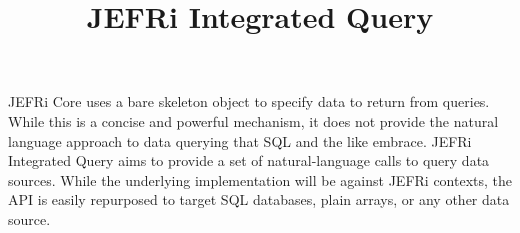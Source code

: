 \documentclass{article}
\begin{document}
\title{JEFRi Integrated Query}
\maketitle
\tableofcontents
\newpage
\linespread{1.6}
JEFRi Core uses a bare skeleton object to specify data to return from queries.
While this is a concise and powerful mechanism, it does not provide the
natural language approach to data querying that SQL and the like embrace.
JEFRi Integrated Query aims to provide a set of natural-language calls to
query data sources. While the underlying implementation will be against JEFRi
contexts, the API is easily repurposed to target SQL databases, plain arrays,
or any other data source.


\end{document}
